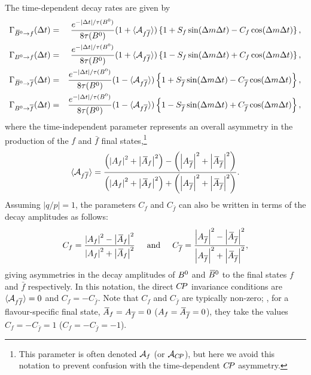 The time-dependent decay rates are given by
\begin{eqnarray}
  \Gamma_{\Bzb \to f} (\Delta t) & = &
  \frac{e^{-\left| \Delta t \right| / \tau(\Bz)}}{8\tau(\Bz)} 
  ( 1 + \Adirnoncp ) 
  \left\{ 
    1 + S_f \sin(\Delta m \Delta t) - C_f \cos(\Delta m \Delta t) 
  \right\},
  \\
  \Gamma_{\Bz \to f} (\Delta t) & = &
  \frac{e^{-\left| \Delta t \right| / \tau(\Bz)}}{8\tau(\Bz)} 
  ( 1 + \Adirnoncp ) 
  \left\{ 
    1 - S_f \sin(\Delta m \Delta t) + C_f \cos(\Delta m \Delta t) 
  \right\},
  \\
  \Gamma_{\Bzb \to \bar{f}} (\Delta t) & = &
  \frac{e^{-\left| \Delta t \right| / \tau(\Bz)}}{8\tau(\Bz)} 
  ( 1 - \Adirnoncp ) 
  \left\{ 
    1 + S_{\bar{f}} \sin(\Delta m \Delta t) - C_{\bar{f}} \cos(\Delta m \Delta t) 
  \right\},
  \\
  \Gamma_{\Bz \to \bar{f}} (\Delta t) & = &
    \frac{e^{-\left| \Delta t \right| / \tau(\Bz)}}{8\tau(\Bz)} 
  ( 1 - \Adirnoncp ) 
  \left\{ 
    1 - S_{\bar{f}} \sin(\Delta m \Delta t) + C_{\bar{f}} \cos(\Delta m \Delta t) 
  \right\},
\end{eqnarray}
where the time-independent parameter \Adirnoncp
represents an overall asymmetry in the production of the 
$f$ and $\bar{f}$ final states,\footnote{
  This parameter is often denoted ${\cal A}_f$ (or ${\cal A}_{C\!P}$),
  but here we avoid this notation to prevent confusion with the
  time-dependent $C\!P$ asymmetry.
}
\begin{equation}
  \Adirnoncp = 
  \frac{
    \left( 
      \left| \Af \right|^2 + \left| \Abarf \right|^2
    \right) - 
    \left( 
      \left| \Afbar \right|^2 + \left| \Abarfbar \right|^2
    \right)
  }{
    \left( 
      \left| \Af \right|^2 + \left| \Abarf \right|^2
    \right) +
    \left( 
      \left| \Afbar \right|^2 + \left| \Abarfbar \right|^2
    \right)
  }.
\end{equation}
Assuming $|q/p| = 1$,
the parameters $C_f$ and $C_{\bar{f}}$
can also be written in terms of the decay amplitudes as follows:
\begin{equation}
  C_f = 
  \frac{
    \left| \Af \right|^2 - \left| \Abarf \right|^2 
  }{
    \left| \Af \right|^2 + \left| \Abarf \right|^2
  }
  \hspace{5mm}
  {\rm and}
  \hspace{5mm}
  C_{\bar{f}} = 
  \frac{
    \left| \Afbar \right|^2 - \left| \Abarfbar \right|^2
  }{
    \left| \Afbar \right|^2 + \left| \Abarfbar \right|^2
  },
\end{equation}
giving asymmetries in the decay amplitudes of $B^0$ and $\kern 0.18em\overline{\kern -0.18em B}{}^0$
to the final states $f$ and $\bar{f}$ respectively.
In this notation, the direct $C\!P$ invariance conditions are
$\Adirnoncp = 0$ and $C_f = - C_{\bar{f}}$.
Note that $C_f$ and $C_{\bar{f}}$ are typically non-zero;
\eg, for a flavour-specific final state, 
$\Abarf = \Afbar = 0$ ($\Af = \Abarfbar = 0$), they take the values
$C_f = - C_{\bar{f}} = 1$ ($C_f = - C_{\bar{f}} = -1$).

